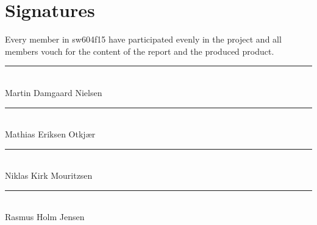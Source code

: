 
\chapter*{Signatures}
Every member in sw604f15 have participated evenly in the project and all members vouch for the content of the report and the produced product.

\vspace{1cm}

\vspace*{\fill}


\noindent
\rule{9cm}{1pt}				\\
\vspace{1.5cm}
Martin Damgaard Nielsen		\\


\noindent
\rule{9cm}{1pt}				\\
\vspace{1.5cm}
Mathias Eriksen Otkjær	    \\


\noindent
\rule{9cm}{1pt}				\\
\vspace{1.5cm}
Niklas Kirk Mouritzsen		\\


\noindent
\rule{9cm}{1pt}				\\
\vspace{1.5cm}
Rasmus Holm Jensen			\\

\vspace*{\fill}